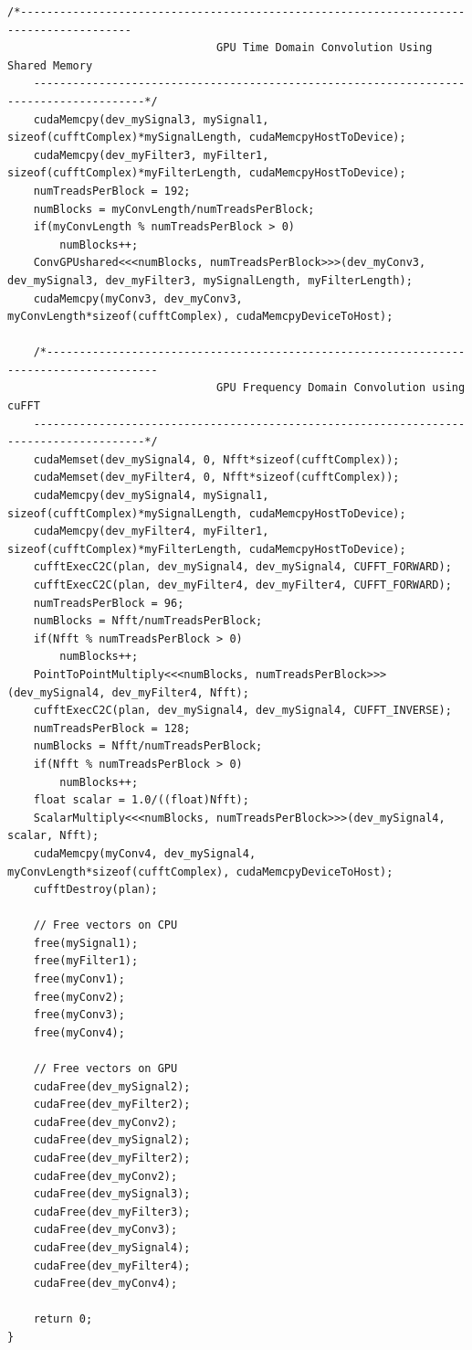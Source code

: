 \begin{lstlisting}[caption={CUDA code to performing complex convolution four different ways: time domain CPU, time domain GPU, time domain GPU using shared memory and frequency domain GPU.},label={code:convFun}]
	/*---------------------------------------------------------------------------------------
                                GPU Time Domain Convolution Using Shared Memory
	---------------------------------------------------------------------------------------*/
	cudaMemcpy(dev_mySignal3, mySignal1, sizeof(cufftComplex)*mySignalLength, cudaMemcpyHostToDevice);
	cudaMemcpy(dev_myFilter3, myFilter1, sizeof(cufftComplex)*myFilterLength, cudaMemcpyHostToDevice);
	numTreadsPerBlock = 192;
	numBlocks = myConvLength/numTreadsPerBlock;
	if(myConvLength % numTreadsPerBlock > 0)
		numBlocks++;
	ConvGPUshared<<<numBlocks, numTreadsPerBlock>>>(dev_myConv3, dev_mySignal3, dev_myFilter3, mySignalLength, myFilterLength);
	cudaMemcpy(myConv3, dev_myConv3, myConvLength*sizeof(cufftComplex), cudaMemcpyDeviceToHost);

	/*---------------------------------------------------------------------------------------
                                GPU Frequency Domain Convolution using cuFFT
	---------------------------------------------------------------------------------------*/
	cudaMemset(dev_mySignal4, 0, Nfft*sizeof(cufftComplex));
	cudaMemset(dev_myFilter4, 0, Nfft*sizeof(cufftComplex));
	cudaMemcpy(dev_mySignal4, mySignal1, sizeof(cufftComplex)*mySignalLength, cudaMemcpyHostToDevice);
	cudaMemcpy(dev_myFilter4, myFilter1, sizeof(cufftComplex)*myFilterLength, cudaMemcpyHostToDevice);
	cufftExecC2C(plan, dev_mySignal4, dev_mySignal4, CUFFT_FORWARD);
	cufftExecC2C(plan, dev_myFilter4, dev_myFilter4, CUFFT_FORWARD);
	numTreadsPerBlock = 96;
	numBlocks = Nfft/numTreadsPerBlock;
	if(Nfft % numTreadsPerBlock > 0)
		numBlocks++;
	PointToPointMultiply<<<numBlocks, numTreadsPerBlock>>>(dev_mySignal4, dev_myFilter4, Nfft);
	cufftExecC2C(plan, dev_mySignal4, dev_mySignal4, CUFFT_INVERSE);
	numTreadsPerBlock = 128;
	numBlocks = Nfft/numTreadsPerBlock;
	if(Nfft % numTreadsPerBlock > 0)
		numBlocks++;
	float scalar = 1.0/((float)Nfft);
	ScalarMultiply<<<numBlocks, numTreadsPerBlock>>>(dev_mySignal4, scalar, Nfft);
	cudaMemcpy(myConv4, dev_mySignal4, myConvLength*sizeof(cufftComplex), cudaMemcpyDeviceToHost);
	cufftDestroy(plan);

	// Free vectors on CPU
	free(mySignal1);
	free(myFilter1);
	free(myConv1);
	free(myConv2);
	free(myConv3);
	free(myConv4);

	// Free vectors on GPU
	cudaFree(dev_mySignal2);
	cudaFree(dev_myFilter2);
	cudaFree(dev_myConv2);
	cudaFree(dev_mySignal2);
	cudaFree(dev_myFilter2);
	cudaFree(dev_myConv2);
	cudaFree(dev_mySignal3);
	cudaFree(dev_myFilter3);
	cudaFree(dev_myConv3);
	cudaFree(dev_mySignal4);
	cudaFree(dev_myFilter4);
	cudaFree(dev_myConv4);

	return 0;
}
\end{lstlisting}
\doublespacing